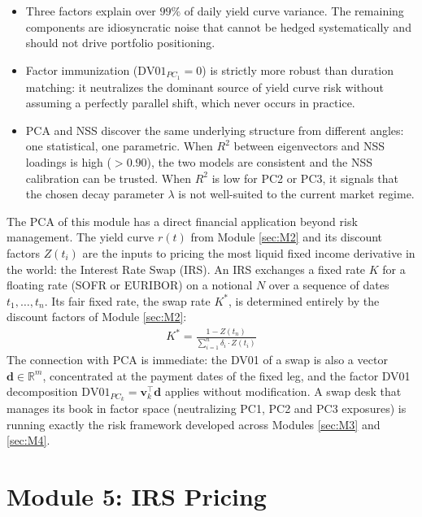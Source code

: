 \documentclass{article}
\theoremstyle{definition}  %
\theoremstyle{plain}  %
\numberwithin{definition}{section}
\numberwithin{proposition}{section}
\numberwithin{theorem}{section}
\numberwithin{equation}{section}
\begin{document}
\begin{itemize}
    \item Three factors explain over $99\%$ of daily yield curve variance. The remaining components are idiosyncratic noise that cannot be hedged systematically and should not drive portfolio positioning.

    \item Factor immunization ($\text{DV01}_{PC_1} = 0$) is strictly more robust than duration matching: it neutralizes the dominant source of yield curve risk without assuming a perfectly parallel shift, which never occurs in practice.

    \item PCA and NSS discover the same underlying structure from different angles: one statistical, one parametric. When $R^2$ between eigenvectors and NSS loadings is high ($> 0.90$), the two models are consistent and the NSS calibration can be trusted. When $R^2$ is low for PC2 or PC3, it signals that the chosen decay parameter $\lambda$ is not well-suited to the current market regime.
\end{itemize}

The PCA of this module has a direct financial application beyond risk management. The yield curve $r(t)$ from Module \ref{sec:M2} and its discount factors $Z(t_i)$ are the inputs to pricing the most liquid fixed income derivative in the world: the Interest Rate Swap (IRS). An IRS exchanges a fixed rate $K$ for a floating rate (SOFR or EURIBOR) on a notional $N$ over a sequence of dates $t_1, \dots, t_n$. Its fair fixed rate, the swap rate $K^*$, is determined entirely by the discount factors of Module \ref{sec:M2}:
\begin{align*}
    K^* = \frac{1 - Z(t_n)}{\sum_{i=1}^{n} 
    \delta_i \cdot Z(t_i)}
\end{align*}
The connection with PCA is immediate: the DV01 of a swap is also a vector $\mathbf{d} \in \mathbb{R}^m$, concentrated at the payment dates of the fixed leg, and the factor DV01 decomposition $\text{DV01}_{PC_k} = \mathbf{v}_k^\top \mathbf{d}$ applies without modification. A swap desk that manages its book in factor space (neutralizing PC1, PC2 and PC3 exposures) is running exactly the risk framework developed across Modules \ref{sec:M3} and \ref{sec:M4}.

\newpage

\section{Module 5: IRS Pricing}
\label{sec:M5}
\end{document}
